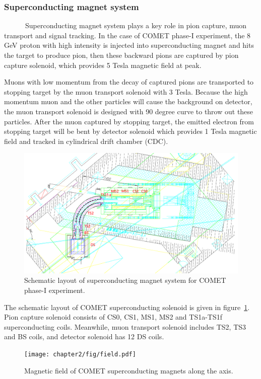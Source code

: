 \subsubsection{Superconducting magnet system}
~~~~~~Superconducting magnet system plays a key role in pion capture, muon transport and signal tracking.
In the case of COMET phase-I experiment, the 8 GeV proton with high intensity is injected into superconducting magnet and hits the target to produce pion, then these backward pions are captured by pion capture solenoid, which provides 5 Tesla magnetic field at peak.

Muons with low momentum from the decay of captured pions are transported to stopping target by the muon transport solenoid with 3 Tesla.
Because the high momentum muon and the other particles will cause the background on detector, the muon transport solenoid is designed with 90 degree curve to throw out these particles.
After the muon captured by stopping target, the emitted electron from stopping target will be bent by detector solenoid which provides 1 Tesla magnetic field and tracked in cylindrical drift chamber (CDC).
\begin{figure}[H]
 \centering
 \includegraphics[scale=0.45]{chapter2/fig/solenoid.pdf}
 \caption{Schematic layout of superconducting magnet system for COMET phase-I experiment.}
 \label{solenoid}
\end{figure}

The schematic layout of COMET superconducting solenoid is given in figure~\ref{solenoid}.
Pion capture solenoid consists of CS0, CS1, MS1, MS2 and TS1a-TS1f superconducting coils.
Meanwhile, muon transport solenoid includes TS2, TS3 and BS coils, and detector solenoid has 12 DS coils.

\begin{figure}[H]
 \centering
 \texttt{[image: chapter2/fig/field.pdf]}
 \caption{Magnetic field of COMET superconducting magnets along the axis.}
 \label{2field}
\end{figure}

